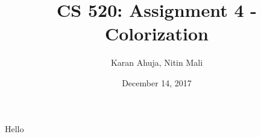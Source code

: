 \documentclass[a4paper]{article}
\title{\textbf{CS 520: Assignment 4 - Colorization}}
\author{Karan Ahuja, Nitin Mali}
\date{December 14, 2017}
\begin{document}
Hello 
\end{document}
